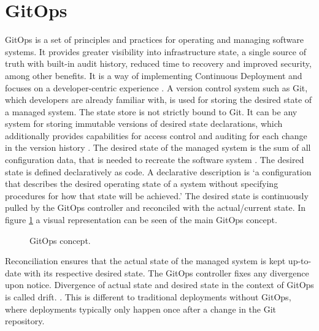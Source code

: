 \section{GitOps}
\label{theoretical-background:gitops}

GitOps is a set of principles and practices for operating and managing software systems.
It provides greater visibility into infrastructure state,
a single source of truth with built-in audit history,
reduced time to recovery and improved security,
among other benefits.
It is a way of implementing Continuous Deployment
and focuses on a developer-centric experience \autocite{gitopsCloudnativeCDInnoq}.
A version control system such as Git, which developers are already familiar with,
is used for storing the desired state of a managed system.
The state store is not strictly bound to Git.
It can be any system for storing immutable versions of desired state declarations,
which additionally provides capabilities for access control and auditing for each change
in the version history
\autocite{gitopsGlossary}.
The desired state of the managed system is
the sum of all configuration data, that is needed
to recreate the software system \autocite{gitopsGlossary}.
The desired state is defined declaratively as code.
A declarative description is
\enquote*{a configuration that describes the desired operating state of a system without specifying procedures for how that state will be achieved.}
\autocite{gitopsGlossary}
The desired state is continuously pulled by the GitOps controller and reconciled with the actual/current state.
In figure \ref{fig:gitOpsConcept} a visual representation can be seen of the main GitOps concept.

\begin{figure}[h]
	\centering
	\caption{GitOps concept.
	}
	\label{fig:gitOpsConcept}	
\end{figure}

Reconciliation ensures that the actual state of the managed system is kept up-to-date
with its respective desired state. The GitOps controller fixes any divergence upon notice.
Divergence of actual state and desired state in the context of GitOps is called drift.
\autocite{gitopsGlossary}.
This is different to traditional deployments without GitOps,
where deployments typically only happen once after a change in the Git repository.


